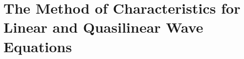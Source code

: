 \chapter{The Method of Characteristics for Linear and Quasilinear Wave Equations}
\label{ch:characteristics}








